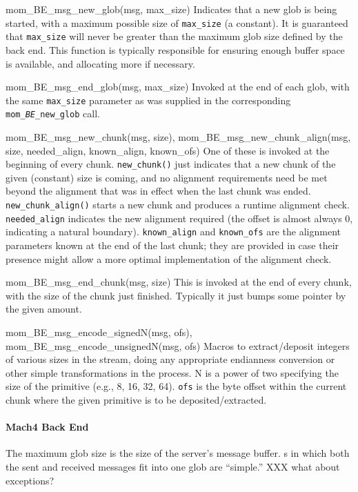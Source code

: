 \begin{cprototypelist}
  \item[mom_BE_msg_new_glob(msg, max_size)]
  Indicates that a new glob is being started, with a maximum possible size of
  \texttt{max\_size} (a constant).  It is guaranteed that \texttt{max\_size}
  will never be greater than the maximum glob size defined by the back end.
  This function is typically responsible for ensuring enough buffer space is
  available, and allocating more if necessary.

  \item[mom_BE_msg_end_glob(msg, max_size)]
  Invoked at the end of each glob, with the same \texttt{max\_size} parameter
  as was supplied in the corresponding \texttt{mom\_\emph{BE}\_new\_glob} call.

  \item[mom_BE_msg_new_chunk(msg, size),
  mom_BE_msg_new_chunk_align(msg, size, needed_align, known_align,
                                  known_ofs)]
  One of these is invoked at the beginning of every chunk.
  \texttt{new\_chunk()} just indicates that a new chunk of the given (constant)
  size is coming, and no alignment requirements need be met beyond the
  alignment that was in effect when the last chunk was ended.
  \texttt{new\_chunk\_align()} starts a new chunk and produces a runtime
  alignment check.  \texttt{needed\_align} indicates the new alignment required
  (the offset is almost always 0, indicating a natural boundary).
  \texttt{known\_align} and \texttt{known\_ofs} are the alignment parameters
  known at the end of the last chunk; they are provided in case their presence
  might allow a more optimal implementation of the alignment check.

  \item[mom_BE_msg_end_chunk(msg, size)]
  This is invoked at the end of every chunk, with the size of the chunk just
  finished.  Typically it just bumps some pointer by the given amount.

  \item[mom_BE_msg_encode_signedN(msg, ofs),
  mom_BE_msg_encode_unsignedN(msg, ofs)]
  Macros to extract/deposit integers of various sizes in the stream, doing any
  appropriate endianness conversion or other simple transformations in the
  process.  N is a power of two specifying the size of the primitive (e.g., 8,
  16, 32, 64).  \texttt{ofs} is the byte offset within the current chunk where
  the given primitive is to be deposited/extracted.
\end{cprototypelist}

\paragraph{Mach4 Back End} %

The maximum glob size is the size of the server's message buffer.  \RPC{}s in
which both the sent and received messages fit into one glob are ``simple.''
XXX what about exceptions?




